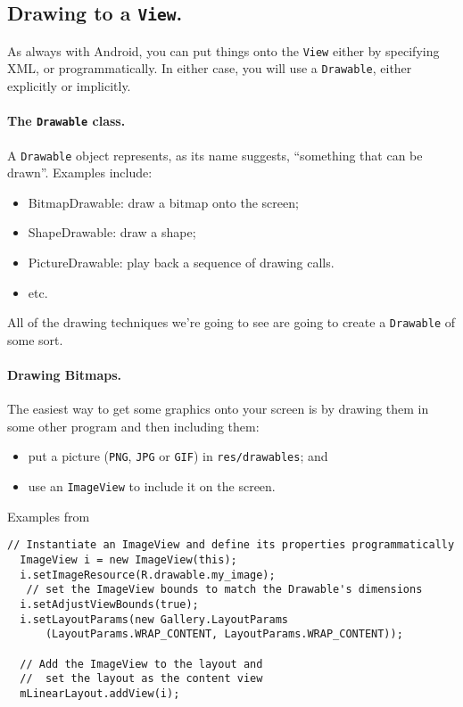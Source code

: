 \subsection*{Drawing to a {\tt View}.} 
As always with Android, you can put things onto the {\tt View} either 
by specifying XML, or programmatically. In either case, you will use
a {\tt Drawable}, either explicitly or implicitly.

\paragraph{The {\tt Drawable} class.}
A {\tt Drawable} object represents, as its name suggests, 
``something that can be drawn''. Examples include:
\begin{itemize}
\item BitmapDrawable: draw a bitmap onto the screen;
\item ShapeDrawable: draw a shape;
\item PictureDrawable: play back a sequence of drawing calls.
\item etc.
\end{itemize}
All of the drawing techniques we're going to see are going
to create a {\tt Drawable} of some sort.

\paragraph{Drawing Bitmaps.} 
The easiest way to get some graphics onto your screen is by
drawing them in some other program and then including them:
\begin{itemize}
\item put a picture ({\tt PNG}, {\tt JPG} or {\tt GIF}) in {\tt res/drawables}; and
\item use an {\tt ImageView} to include it on the screen.
\end{itemize}

Examples from~\cite{android:graphics}
\begin{lstlisting}[basicstyle=\scriptsize]
  // Instantiate an ImageView and define its properties programmatically
  ImageView i = new ImageView(this);
  i.setImageResource(R.drawable.my_image);
   // set the ImageView bounds to match the Drawable's dimensions
  i.setAdjustViewBounds(true);
  i.setLayoutParams(new Gallery.LayoutParams
      (LayoutParams.WRAP_CONTENT, LayoutParams.WRAP_CONTENT));

  // Add the ImageView to the layout and 
  //  set the layout as the content view
  mLinearLayout.addView(i);
\end{lstlisting}

